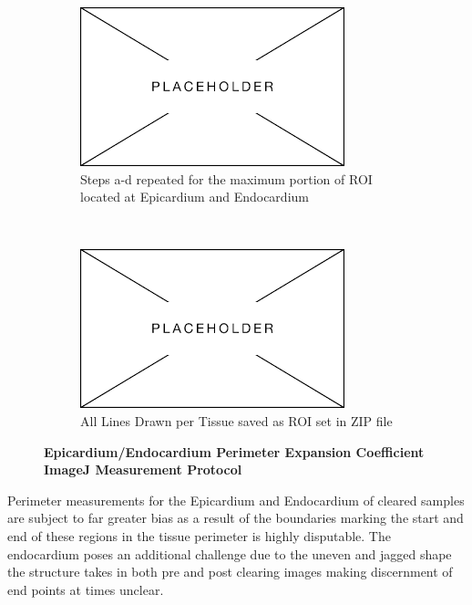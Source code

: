 \begin{figure}[H]
    \begin{subfigure}[c]{0.475\textwidth}
    \centering
    \includegraphics[width=1\linewidth]{Figures/Placeholder.png}
    \caption{Steps a-d repeated for the maximum portion of ROI located at Epicardium and Endocardium}
    \end{subfigure}
    ~
    \begin{subfigure}[d]{0.475\textwidth}
    \centering
    \includegraphics[width=1\linewidth]{Figures/Placeholder.png}
    \caption{All Lines Drawn per Tissue saved as ROI set in ZIP file}
    \end{subfigure}
    \medskip  
    
    \caption{\textbf{Epicardium/Endocardium Perimeter Expansion Coefficient ImageJ Measurement Protocol}}
    \label{fig:enter-label}
\end{figure}

Perimeter measurements for the Epicardium and Endocardium of cleared samples are subject to far greater bias as a result of the boundaries marking the start and end of these regions in the tissue perimeter is highly disputable. The endocardium poses an additional challenge due to the uneven and jagged shape the structure takes in both pre and post clearing images making discernment of end points at times unclear. 

